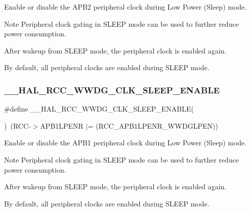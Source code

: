 Enable or disable the A\+P\+B2 peripheral clock during Low Power (Sleep) mode. 

\begin{DoxyNote}{Note}
Peripheral clock gating in S\+L\+E\+EP mode can be used to further reduce power consumption. 

After wakeup from S\+L\+E\+EP mode, the peripheral clock is enabled again. 

By default, all peripheral clocks are enabled during S\+L\+E\+EP mode. 
\end{DoxyNote}
\mbox{\label{group___r_c_c___peripheral___clock___sleep___enable___disable_gaa3978a2e193b921dc24976880dce7a26}} 
\subsubsection{\texorpdfstring{\_\_HAL\_RCC\_WWDG\_CLK\_SLEEP\_ENABLE}{\_\_HAL\_RCC\_WWDG\_CLK\_SLEEP\_ENABLE}}
{\footnotesize\ttfamily \#define \+\_\+\+\_\+\+H\+A\+L\+\_\+\+R\+C\+C\+\_\+\+W\+W\+D\+G\+\_\+\+C\+L\+K\+\_\+\+S\+L\+E\+E\+P\+\_\+\+E\+N\+A\+B\+LE(\begin{DoxyParamCaption}{ }\end{DoxyParamCaption})~(R\+CC-\/$>$A\+P\+B1\+L\+P\+E\+NR $\vert$= (R\+C\+C\+\_\+\+A\+P\+B1\+L\+P\+E\+N\+R\+\_\+\+W\+W\+D\+G\+L\+P\+EN))}



Enable or disable the A\+P\+B1 peripheral clock during Low Power (Sleep) mode. 

\begin{DoxyNote}{Note}
Peripheral clock gating in S\+L\+E\+EP mode can be used to further reduce power consumption. 

After wakeup from S\+L\+E\+EP mode, the peripheral clock is enabled again. 

By default, all peripheral clocks are enabled during S\+L\+E\+EP mode. 
\end{DoxyNote}
